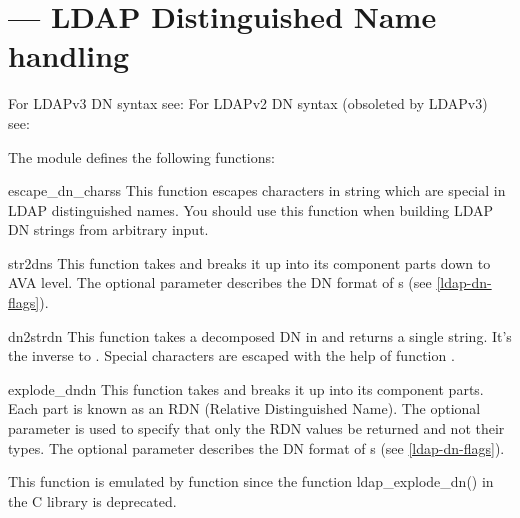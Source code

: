 
\section{ ---
  LDAP Distinguished Name handling }




\begin{seealso}
For LDAPv3 DN syntax see:
For LDAPv2 DN syntax (obsoleted by LDAPv3) see:
\end{seealso}

The  module defines the following functions:

\begin{funcdesc}{escape_dn_chars}{s} %
  This function escapes characters in string  which
  are special in LDAP distinguished names. You should use
  this function when building LDAP DN strings from arbitrary input.
\end{funcdesc}

\begin{funcdesc}{str2dn}{s } %
  This function takes  and breaks it up into its component parts
  down to AVA level. The optional parameter  describes the DN format of s
  (see \ref{ldap-dn-flags}).
\end{funcdesc}


\begin{funcdesc}{dn2str}{dn} %
  This function takes a decomposed DN in  and returns
  a single string. It's the inverse to .
  Special characters are escaped with the help of
  function .
\end{funcdesc}


\begin{funcdesc}{explode_dn}{dn } %
  This function takes  and breaks it up into its component parts. 
  Each part is known as an RDN (Relative Distinguished Name). The optional
   parameter is used to specify that only the RDN values be 
  returned and not their types. The optional parameter 
  describes the DN format of s (see \ref{ldap-dn-flags}).

  This function is emulated by function 
  since the function ldap_explode_dn() in the C library is deprecated.
\end{funcdesc}

